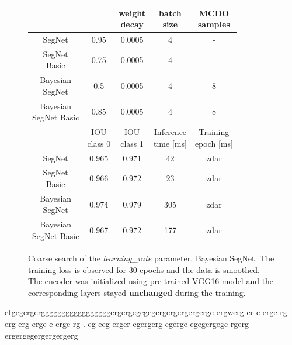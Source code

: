 \renewcommand{\arraystretch}{1.1}
\begin{figure}[t]
\centering	
	\begin{tabular}{|c|c|c|c|c|}
	\hline
	\thead{Architecture} & \thead{base\_lr} & \thead{weight \\ decay} & \thead{batch \\ size} & \thead{MCDO \\ samples}\\		
	\hline
	SegNet & 0.95 & 0.0005 & 4 & - \\
	\hline
	\makecell{SegNet \\ Basic} & 0.75 & 0.0005 & 4 & - \\
	\hline
	\makecell{Bayesian \\ SegNet} & 0.5 & 0.0005 & 4 & 8 \\	
	\hline
	\makecell{Bayesian \\ SegNet Basic} & 0.85 & 0.0005 & 4 & 8 \\
	\hline
	& \thead{IOU \\ class 0} & \thead{IOU \\ class 1} & \thead{Inference \\ time [ms] } & \thead{Training \\ epoch [ms] }\\		
	\hline	
	SegNet & 0.965 & 0.971 & 42 & zdar \\	
	\hline	
	\makecell{SegNet \\ Basic} & 0.966 & 0.972 & 23 & zdar \\	
	\hline	
	\makecell{Bayesian \\ SegNet} & 0.974 & 0.979 & 305 & zdar \\	
	\hline	
	\makecell{Bayesian \\ SegNet Basic} & 0.967 & 0.972 & 177 & zdar \\
	\hline
	\end{tabular}
\vspace{10mm}
\caption{Coarse search of the \textit{learning\_rate} parameter, Bayesian SegNet. The training loss is observed for 30 epochs and the data is smoothed. The encoder was initialized using pre-trained VGG16 model and the corresponding layers stayed \textbf{unchanged} during the training.} 
\label{zdarec}
\end{figure}

etgegergergggggggggggggggggergergegegegergergergergerge ergwerg er e erge rg erg erg erge e erge rg . eg eeg erger 
 egergerg egerge 
  egegergege
  rgerg ergergegergergergerg

